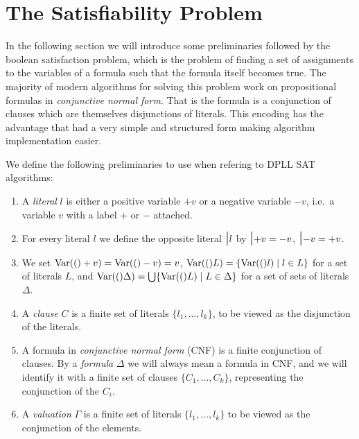 \section{The Satisfiability Problem}
In the following section we will introduce some preliminaries followed by the boolean satisfaction problem, which is the problem of finding a set of assignments to the variables of a formula such that the formula itself becomes true. The majority of modern algorithms for solving this problem work on propositional formulas in \emph{conjunctive normal form}. That is the formula is a conjunction of clauses which are themselves disjunctions of literals. This encoding has the advantage that had a very simple and structured form making algorithm implementation easier.
\medskip
\begin{mydef}[Preliminaries]
We define the following preliminaries to use when refering to DPLL SAT algorithms:

\begin{enumerate}
\item A \emph{literal} $l$ is either a positive variable $+v$ or a negative variable $-v$, i.e.\ a variable $v$ with a label $+$ or ${-}$ attached.

\item For every literal $l$ we define the opposite literal $\mbox{\Large \textbar}{l}$ by $\mbox{\Large \textbar}{+v}= -v$, $\mbox{\Large \textbar}{-v} = +v$. 

\item We set $\mathrm{Var}(()+v) = \mathrm{Var}(()-v) = v$, $\mathrm{Var}(()L) = \{\mathrm{Var}(()l) \mid l\in L\}$
for a set of literals $L$, and 
$\mathrm{Var}(()\Delta) = \bigcup\{\mathrm{Var}(()L)\mid L\in\Delta\}$ for a set of sets of 
literals $\Delta$.

\item A \emph{clause} $C$ is a finite set of literals 
$\{ l_1, \ldots , l_k \}$, to be viewed as the disjunction of the literals.

\item A formula in \emph{conjunctive normal form} (CNF) is a 
finite conjunction of clauses. 
%
By a \emph{formula} $\Delta$ we will always mean a formula in CNF,
and we will identify it with a finite set of clauses 
$\{ C_1 , \ldots , C_k \}$, representing the conjunction of the $C_i$.

\item A \emph{valuation} $\Gamma$ is a finite set of literals $\{ l_1, \ldots , l_k \}$ to be viewed as the conjunction of the elements.


\end{enumerate}
\end{mydef}
